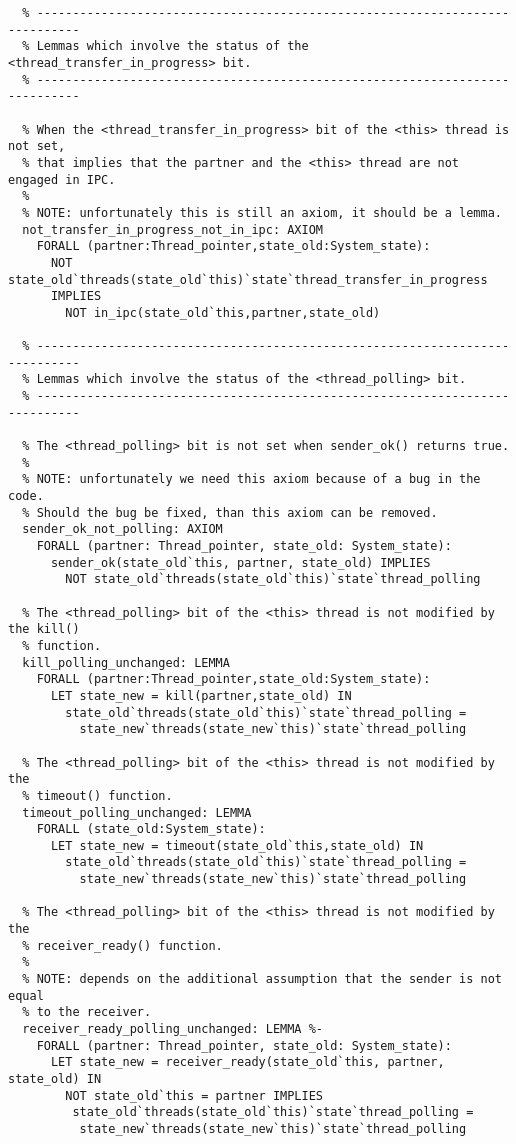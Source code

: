 \begin{lstlisting}
  % ----------------------------------------------------------------------------
  % Lemmas which involve the status of the <thread_transfer_in_progress> bit.
  % ----------------------------------------------------------------------------

  % When the <thread_transfer_in_progress> bit of the <this> thread is not set,
  % that implies that the partner and the <this> thread are not engaged in IPC.
  %
  % NOTE: unfortunately this is still an axiom, it should be a lemma.
  not_transfer_in_progress_not_in_ipc: AXIOM
    FORALL (partner:Thread_pointer,state_old:System_state):
      NOT state_old`threads(state_old`this)`state`thread_transfer_in_progress
      IMPLIES 
        NOT in_ipc(state_old`this,partner,state_old)

  % ----------------------------------------------------------------------------
  % Lemmas which involve the status of the <thread_polling> bit.
  % ----------------------------------------------------------------------------
 
  % The <thread_polling> bit is not set when sender_ok() returns true.
  %
  % NOTE: unfortunately we need this axiom because of a bug in the code. 
  % Should the bug be fixed, than this axiom can be removed.
  sender_ok_not_polling: AXIOM
    FORALL (partner: Thread_pointer, state_old: System_state):
      sender_ok(state_old`this, partner, state_old) IMPLIES
        NOT state_old`threads(state_old`this)`state`thread_polling

  % The <thread_polling> bit of the <this> thread is not modified by the kill()
  % function.
  kill_polling_unchanged: LEMMA
    FORALL (partner:Thread_pointer,state_old:System_state):
      LET state_new = kill(partner,state_old) IN
        state_old`threads(state_old`this)`state`thread_polling =
          state_new`threads(state_new`this)`state`thread_polling

  % The <thread_polling> bit of the <this> thread is not modified by the
  % timeout() function.
  timeout_polling_unchanged: LEMMA
    FORALL (state_old:System_state):
      LET state_new = timeout(state_old`this,state_old) IN
        state_old`threads(state_old`this)`state`thread_polling =
          state_new`threads(state_new`this)`state`thread_polling

  % The <thread_polling> bit of the <this> thread is not modified by the
  % receiver_ready() function.
  %
  % NOTE: depends on the additional assumption that the sender is not equal
  % to the receiver.
  receiver_ready_polling_unchanged: LEMMA %-
    FORALL (partner: Thread_pointer, state_old: System_state):
      LET state_new = receiver_ready(state_old`this, partner, state_old) IN
        NOT state_old`this = partner IMPLIES
         state_old`threads(state_old`this)`state`thread_polling =
          state_new`threads(state_new`this)`state`thread_polling 


\end{lstlisting}
